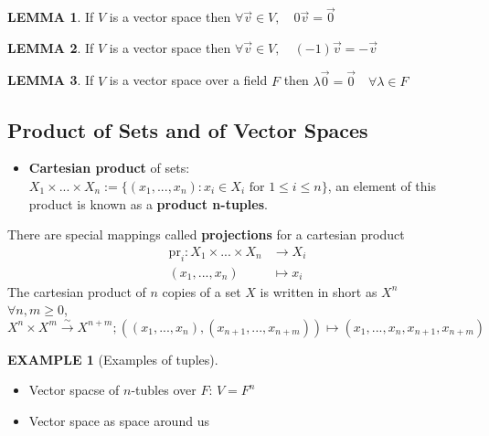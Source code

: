 \documentclass[12pt]{article}
\theoremstyle{definition}
\newtheorem{lemma}{LEMMA}[subsection]
\newtheorem{example}{EXAMPLE}[subsection]
\begin{document}
\begin{lemma}
    If $V$ is a vector space then $\forall \overrightarrow{v} \in V,\quad 0\overrightarrow{v} = \overrightarrow{0}$
\end{lemma}
\begin{lemma}
    If $V$ is a vector space then $\forall \overrightarrow{v} \in V, \quad (-1)\overrightarrow{v} = -\overrightarrow{v}$
\end{lemma}
\begin{lemma}
    If $V$ is a vector space over a field $F$ then $\lambda\overrightarrow{0} = \overrightarrow{0} \quad \forall \lambda\in F$
\end{lemma}

\subsection{Product of Sets and of Vector Spaces}
\begin{itemize}
    \item
          \textbf{Cartesian product} of sets: $X_1 \times ... \times X_n := \{(x_1,...,x_n):x_i\in X_i \text{ for } 1 \leq i \leq n\}$, an element of this product is known as a \textbf{product n-tuples}.\newline
\end{itemize}
There are special mappings called \textbf{projections} for a cartesian product
\[\begin{split}
        \text{pr}_i: X_1\times ... \times X_n &\rightarrow X_i\\
        (x_1,...,x_n) &\mapsto x_i
    \end{split}\]
The cartesian product of $n$ copies of a set $X$ is written in short as $X^n$\\
$\forall n,m \geq 0$, $X^n\times X^m\xrightarrow{\sim} X^{n+m}; ((x_1,...,x_n),(x_{n+1},...,x_{n+m}))\mapsto(x_1,...,x_n,x_{n+1},x_{n+m})$

\begin{example}[Examples of tuples]
    \quad
    \begin{itemize}
        \item Vector spacse of $n$-tubles over $F$: $V = F^n$
        \item Vector space as space around us
    \end{itemize}
\end{example}

\end{document}
